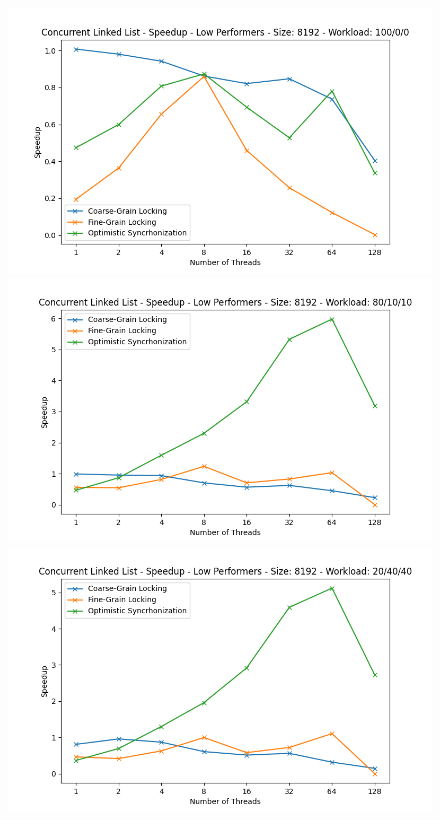 \documentclass[../final_report.tex]{subfiles}
\begin{document}
\begin{figure}[H]
    \centering
        \includegraphics[scale=0.4]{outFiles/plots/concurrent_data_structs_low_speedup_8192_100_0_0.png}
        \includegraphics[scale=0.4]{outFiles/plots/concurrent_data_structs_low_speedup_8192_80_10_10.png}
        \includegraphics[scale=0.4]{outFiles/plots/concurrent_data_structs_low_speedup_8192_20_40_40.png}

\end{figure}
\end{document}

